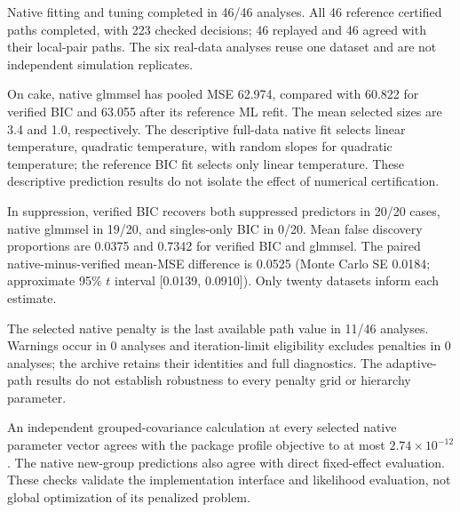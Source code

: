 Native fitting and tuning completed in 46/46 analyses. All 46 reference certified paths completed, with 223 checked decisions; 46 replayed and 46 agreed with their local-pair paths. The six real-data analyses reuse one dataset and are not independent simulation replicates.

On cake, native glmmsel has pooled MSE 62.974, compared with 60.822 for verified BIC and 63.055 after its reference ML refit. The mean selected sizes are 3.4 and 1.0, respectively. The descriptive full-data native fit selects linear temperature, quadratic temperature, with random slopes for quadratic temperature; the reference BIC fit selects only linear temperature. These descriptive prediction results do not isolate the effect of numerical certification.

In suppression, verified BIC recovers both suppressed predictors in 20/20 cases, native glmmsel in 19/20, and singles-only BIC in 0/20. Mean false discovery proportions are 0.0375 and 0.7342 for verified BIC and glmmsel. The paired native-minus-verified mean-MSE difference is 0.0525 (Monte Carlo SE 0.0184; approximate 95\% $t$ interval [0.0139, 0.0910]). Only twenty datasets inform each estimate.

The selected native penalty is the last available path value in 11/46 analyses. Warnings occur in 0 analyses and iteration-limit eligibility excludes penalties in 0 analyses; the archive retains their identities and full diagnostics. The adaptive-path results do not establish robustness to every penalty grid or hierarchy parameter.

An independent grouped-covariance calculation at every selected native parameter vector agrees with the package profile objective to at most $2.74\times10^{-12}$. The native new-group predictions also agree with direct fixed-effect evaluation. These checks validate the implementation interface and likelihood evaluation, not global optimization of its penalized problem.
